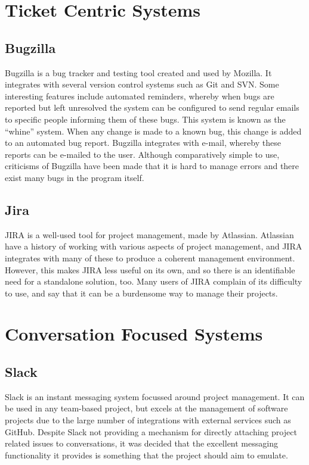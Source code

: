 \documentclass[a4paper]{l3proj}
\begin{document}
\section{Ticket Centric Systems}

\subsection{Bugzilla}
\label{bugzilla}

Bugzilla is a bug tracker and testing tool created and used by Mozilla. It integrates with several version control systems such as Git and SVN.  Some interesting features include automated reminders, whereby when bugs are reported but left unresolved the system can be configured to send regular emails to specific people informing them of these bugs. This system is known as the ``whine'' system.  When any change is made to a known bug, this change is added to an automated bug report.  Bugzilla integrates with e-mail, whereby these reports can be e-mailed to the user. Although comparatively simple to use, criticisms of Bugzilla have been made that it is hard to manage errors and there exist many bugs in the program itself.

\subsection{Jira}
\label{jira}
JIRA \cite{site:django} is a well-used tool for project management, made by Atlassian. Atlassian have a history of working with various aspects of project management, and JIRA integrates with many of these to produce a coherent management environment. However, this makes JIRA less useful on its own, and so there is an identifiable need for a standalone solution, too. Many users of JIRA complain of its difficulty to use, and say that it can be a burdensome way to manage their projects.

\section{Conversation Focused Systems}

\subsection{Slack}
\label{slack}
Slack is an instant messaging system focussed around project management. It can be used in any team-based project, but excels at the management of software projects due to the large number of integrations with external services such as GitHub. Despite Slack not providing a mechanism for directly attaching project related issues to conversations, it was decided that the excellent messaging functionality it provides is something that the project should aim to emulate.
\end{document}
